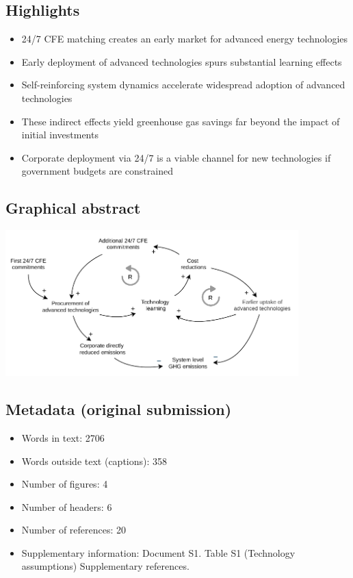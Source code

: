 \documentclass[pdflatex,sn-basic, Numbered]{sn-jnl}
\theoremstyle{thmstyleone}%
\theoremstyle{thmstyletwo}%
\theoremstyle{thmstylethree}%
\begin{document}
\subsection*{Highlights}

\begin{itemize}
\item 24/7 CFE matching creates an early market for advanced energy technologies
\item Early deployment of advanced technologies spurs substantial learning effects
\item Self-reinforcing system dynamics accelerate widespread adoption of advanced technologies
\item These indirect effects yield greenhouse gas savings far beyond the impact of initial investments
\item Corporate deployment via 24/7 is a viable channel for new technologies if government budgets are constrained
\end{itemize}

\subsection*{Graphical abstract}

\begin{center}
    \includegraphics[width=0.85\textwidth]{images/virtuous_dynamics.pdf}
\end{center}

\subsection*{Metadata (original submission)}
\begin{itemize}
    \item Words in text: 2706
    \item Words outside text (captions): 358
    \item Number of figures: 4
    \item Number of headers: 6
    \item Number of references: 20
    \item Supplementary information: Document S1. Table S1 (Technology assumptions) Supplementary references.
\end{itemize}
\end{document}
